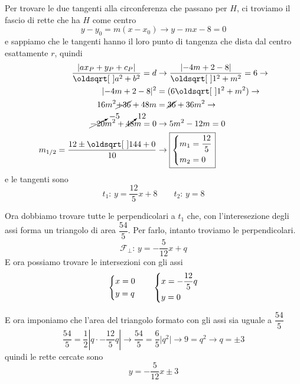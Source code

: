 Per trovare le due tangenti alla circonferenza che passano per $H$, ci troviamo il fascio di rette 
che ha $H$ come centro
\begin{equation*}
y-y_0=m(x-x_0) \rightarrow y-mx-8=0
\end{equation*}
e sappiamo che le tangenti hanno il loro punto di tangenza che dista dal centro esattamente $r$, 
quindi
\begin{align*}
\frac{\lvert ax_P + y_P + c_P\rvert}{\sqrt{a^2+b^2}} = d &\rightarrow
\frac{\lvert-4m+2-8\rvert}{\sqrt{1^2+m^2}} = 6 \rightarrow\\
\lvert-4m+2-8\rvert^2 &= (6\sqrt{1^2+m^2}) \rightarrow\\
16m^2\cancel{+36}+48m&=\cancel{36} + 36m^2 \rightarrow\\
\cancelto{-5}{-20}m^2+\cancelto{12}{48}m = 0 &\rightarrow 5m^2-12m =0 \\
m_{1/2} = \frac{12\pm\sqrt{144+0}}{10} &\rightarrow \boxed{\begin{dcases}
m_1 = \frac{12}{5}\\
m_2 = 0
\end{dcases}}
\end{align*}
e le tangenti sono
\begin{equation*}
\boxed{t_1:\,y = \frac{12}{5}x+8 \qquad t_2:\, y=8}
\end{equation*}

Ora dobbiamo trovare tutte le perpendicolari a $t_1$ che, con l'interesezione degli assi forma un
triangolo di area $\dfrac{54}{5}$. Per farlo, intanto troviamo le perpendicolari.
\begin{equation*}
\mathscr{F_\perp}:\,y=-\frac{5}{12}x + q
\end{equation*}
E ora possiamo trovare le intersezioni con gli assi
\begin{equation*}
\begin{dcases}
x = 0\\
y = q
\end{dcases}\qquad
\begin{dcases}
x = -\frac{12}{5}q\\
y = 0
\end{dcases}
\end{equation*}

E ora imponiamo che l'area del triangolo formato con gli assi sia uguale a $\dfrac{54}{5}$
\begin{equation*}
\frac{54}{5} = \frac{1}{2}\left\lvert q\cdot-\frac{12}{5}q\right\rvert \rightarrow
\frac{54}{5} = \frac{6}{5}\lvert q^2\rvert \rightarrow 9 = q^2 \rightarrow q = \pm3
\end{equation*}
quindi le rette cercate sono
\begin{equation*}
\boxed{y = -\frac{5}{12}x\pm3}
\end{equation*}

